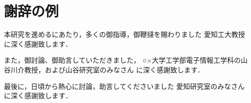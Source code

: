 \chapter*{謝辞の例}

本研究を進めるにあたり，多くの御指導，御鞭撻を賜わりました
愛知工大教授に深く感謝致します．

また，御討論、御助言していただきました，
○×大学工学部電子情報工学科の山谷川介教授，および山谷研究室のみなさん
に深く感謝致します．

最後に，日頃から熱心に討論，助言してくださいました
愛知研究室のみなさんに深く感謝致します．

